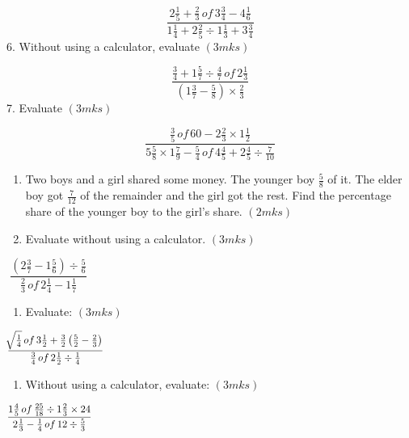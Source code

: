 \documentclass[
  a4paperpaper,
]{scrbook}
\providecommand{\tightlist}{%
  \setlength{\itemsep}{0pt}\setlength{\parskip}{0pt}}\usepackage{longtable,booktabs,array}
\begin{document}
\begin{tcolorbox}
\[
\frac{2\frac{1}{5}+\frac{2}{3}\,of\,3\frac{3}{4}-4\frac{1}{6}}{1\frac{1}{4}+2\frac{2}{5}\div 1\frac{1}{3}+3\frac{3}{4}}  
\] 6. Without using a calculator, evaluate \hspace{11.5cm} \((3mks)\)

\[
\frac{\frac{3}{4}+1\frac{5}{7}\div \frac{4}{7}\,of\, 2\frac{1}{3}}{\left (1\frac{3}{7}-\frac{5}{8}\right)\times\frac{2}{3}}  
\] 7. Evaluate \hspace{9.5cm} \((3mks)\)

\[
\frac{\frac{3}{5}\,of\,60-2\frac{2}{3}\times1\frac{1}{2}}{5\frac{5}{8}\times1\frac{7}{9}-\frac{5}{4}\,of\,4\frac{4}{5}+2\frac{4}{5}\div\frac{7}{10}} 
\]

\begin{enumerate}
\def\labelenumi{\arabic{enumi}.}
\setcounter{enumi}{7}
\item
  Two boys and a girl shared some money. The younger boy \(\frac{5}{8}\)
  of it. The elder boy got \(\frac{7}{12}\) of the remainder and the
  girl got the rest. Find the percentage share of the younger boy to the
  girl's share. \hspace{13.2cm} \((2mks)\)
\item
  Evaluate without using a calculator. \((3mks)\)
\end{enumerate}

\[
\frac{\left( 2\frac{3}{7}-1\frac{5}{6}\right)\div\frac{5}{6}}{\frac{2}{3}\,of\,2\frac{1}{4}-1\frac{1}{7}} \hspace{12cm}
\]

\begin{enumerate}
\def\labelenumi{\arabic{enumi}.}
\setcounter{enumi}{9}
\tightlist
\item
  Evaluate: \((3mks)\)
\end{enumerate}

\[
\frac{\sqrt[]{\frac{1}{4}}\,of\,3\frac{1}{2}+\frac{3}{2}\left(\frac{5}{2}-\frac{2}{3}\right)}{\frac{3}{4}\,of\,2\frac{1}{2}\div\frac{1}{4}} \hspace{10.8cm} 
\]

\begin{enumerate}
\def\labelenumi{\arabic{enumi}.}
\setcounter{enumi}{10}
\tightlist
\item
  Without using a calculator, evaluate: \((3mks)\)
\end{enumerate}

\[
\frac{1\frac{4}{5}\,of\,\frac{25}{18}\div1\frac{2}{3}\times24}{2\frac{1}{3}-\frac{1}{4}\,of\,12\div\frac{5}{3}}  \hspace{11.2cm}    
\]


\end{tcolorbox}
\end{document}
